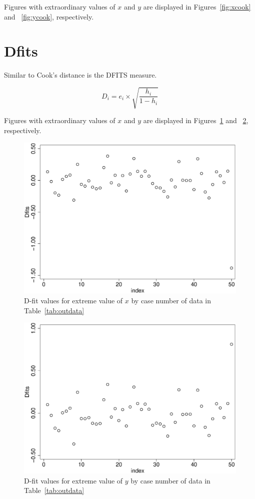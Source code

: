 Figures with extraordinary values of $x$ and $y$ are displayed in Figures~\ref{fig:xcook} and ~\ref{fig:ycook}, respectively.

\section{Dfits}


Similar to Cook's distance is the DFITS measure.

\begin{equation}
D_i = e_i\times \sqrt{\frac{h_i}{1-h_i}}
\end{equation}

Figures with extraordinary values of $x$ and $y$ are displayed in Figures~\ref{fig:xdfit} and ~\ref{fig:ydfit}, respectively.

\begin{figure}
   \centering
   \includegraphics[angle=0,
           width=.75\textwidth]{xout_dfit_index.eps}
   \caption{D-fit values for extreme value of $x$ by case number of data in Table~\ref{tab:outdata}}
  \label{fig:xdfit}
\end{figure}

\begin{figure}
   \centering
   \includegraphics[angle=0,
           width=.75\textwidth]{yout_dfit_index.eps}
   \caption{D-fit values for extreme value of $y$ by case number of data in Table~\ref{tab:outdata}}
  \label{fig:ydfit}
\end{figure}

